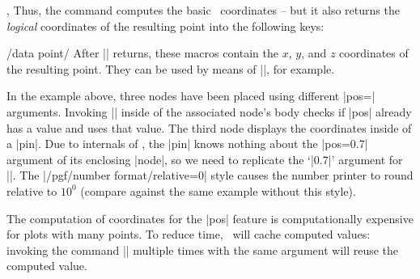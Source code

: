 {\begin{commandlist}{\pgfplotspointplotattime,\pgfplotspointplotattime{}}
	Thus, the command computes the basic \pgfname\ coordinates -- but it also returns the \emph{logical} coordinates of the resulting point into the following keys:
\begin{pgfplotsxykeylist}{/data point/\x}
	After |\pgfplotspointplotattime| returns, these macros contain the $x$, $y$, and $z$ coordinates of the resulting point. They can be used by means of ||, for example.
\begin{codeexample}[]
\end{codeexample}

	In the example above, three nodes have been placed using different |pos=| arguments. Invoking |\pgfplotspointplotattime| inside of the associated node's body checks if |pos| already has a value and uses that value. The third node displays the coordinates inside of a |pin|. Due to internals of \tikzname, the |pin| knows nothing about the |pos=0.7| argument of its enclosing |node|, so we need to replicate the `|0.7|' argument for ||. The |/pgf/number format/relative=0| style causes the number printer to round relative to $10^0$ (compare against the same example without this style).


	 The computation of coordinates for the |pos| feature is computationally expensive for plots with many points. To reduce time, \PGFPlots\ will cache computed values: invoking the command |\pgfplotspointplotattime| multiple times with the same argument will reuse the computed value.
\end{pgfplotsxykeylist}


\end{commandlist}

}

